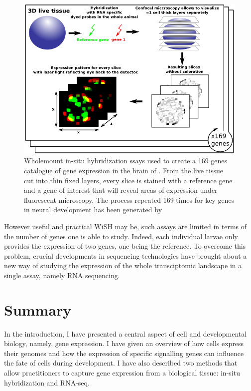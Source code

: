     \begin{figure}[bth]
\centerline{\includegraphics[width=1.3\linewidth]{gfx/chapter1/insitu.png}}
\caption{Wholemount in-situ hybridization ssays used to create a 169 genes catalogue of gene expression in the brain of \platy{}. From the live tissue cut into thin fixed layers, every slice is stained with a reference gene and a gene of interest that will reveal areas of expression under fluorescent microscopy. The process repeated 169 times for key genes in \platy{} neural development has been generated by \cite{Tomer10}}\label{fig:insitu}
	\end{figure}
	
	However useful and practical WiSH may be, such assays are limited in terms of the number of genes one is able to study. Indeed, each individual larvae only provides the expression of two genes, one being the reference. To overcome this problem, crucial developments in sequencing technologies have brought about a new way of studying the expression of the whole transciptomic landscape in a single assay, namely RNA sequencing.


    
\section{Summary}
     
     

	In the introduction, I have presented a central aspect of cell and developmental biology, namely, gene expression. I have given an overview of how cells express their genomes and how the expression of specific signalling genes can influence the fate of cells during development. I have also described two methods that allow practitioners to capture gene expression from a biological tissue: in-situ hybridization and RNA-seq.\\
	

